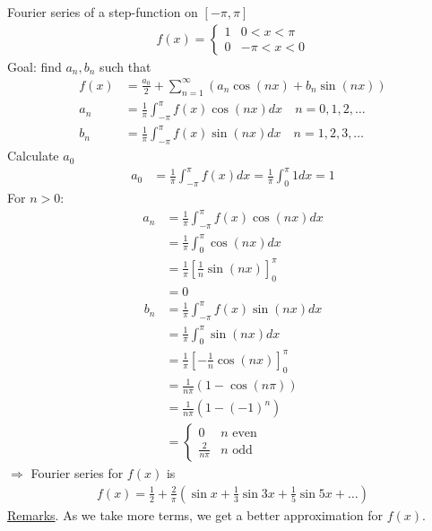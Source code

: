 \documentclass[12pt, letterpaper]{article}
\begin{document}
 Fourier series of a step-function on $[-\pi,\pi]$
\begin{align*}
    f(x) = \begin{cases}
        1 & 0 < x < \pi \\
        0 & -\pi < x < 0
    \end{cases}
\end{align*}
Goal: find $a_n, b_n$ such that
\begin{align*}
    f(x) &= \frac{a_0}{2} + \sum_{n=1}^{\infty} (a_n \cos(nx) + b_n\sin(nx)) \\
    a_n &= \frac 1\pi \int_{-\pi}^{\pi} f(x)\cos(nx)dx \quad n=0,1,2,\dots \\
    b_n &= \frac 1\pi \int_{-\pi}^{\pi} f(x)\sin(nx)dx \quad n=1,2,3,\dots 
\end{align*}
Calculate $a_0$
\begin{align*}
    a_0 &= \frac 1\pi \int_{-\pi}^{\pi}f(x)dx = \frac 1\pi \int_{0}^{\pi}1dx = 1
\end{align*}
For $n > 0$:
\begin{align*}
    a_n &= \frac 1\pi \int_{-\pi}^{\pi} f(x)\cos(nx) dx \\
    &= \frac 1\pi \int_{0}^{\pi}\cos(nx)dx \\
    &= \frac 1\pi \left[\frac 1n \sin(nx)\right]^\pi_0 \\
    &= 0 
\end{align*}
\begin{align*}
    b_n &= \frac 1\pi \int_{-\pi}^{\pi} f(x)\sin(nx)dx \\
    &= \frac 1\pi \int_{0}^{\pi} \sin(nx)dx \\
    &= \frac 1\pi \left[-\frac{1}{n}\cos(nx)\right]^\pi_0 \\
    &= \frac{1}{n\pi}(1-\cos(n\pi)) \\
    &= \frac{1}{n\pi}(1-(-1)^n) \\
    &= \begin{cases}
        0 & n \text{ even} \\
        \frac{2}{n\pi} & n \text{ odd}
    \end{cases}
\end{align*}
$\Rightarrow$ Fourier series for $f(x)$ is 
\begin{align*}
    f(x) = \frac 12 + \frac 2\pi(\sin x + \frac 13 \sin 3x + \frac 15 \sin 5x + \dots)
\end{align*}
\underline{Remarks}. As we take more terms, we get a better approximation for $f(x)$. \\ \\
\end{document}
